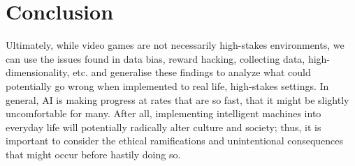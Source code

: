 \documentclass[10pt,twocolumn]{article}
\begin{document}
\section{Conclusion}

Ultimately, while video games are not necessarily high-stakes environments, we can use the issues found in data bias, reward hacking, collecting data, high-dimensionality, etc. and generalise these findings to analyze what could potentially go wrong when implemented to real life, high-stakes settings. In general, AI is making progress at rates that are so fast, that it might be slightly uncomfortable for many. After all, implementing intelligent machines into everyday life will potentially radically alter culture and society; thus, it is important to consider the ethical ramifications and unintentional consequences that might occur before hastily doing so. 

\printbibliography
\end{document}
